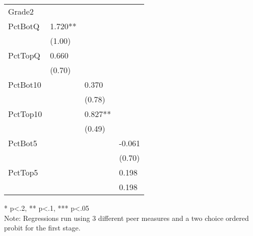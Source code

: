 \begin{table}[!htbp]
\begin{threeparttable}
\begin{tabular}{l l l l}
      Grade2   &                               &                               &                              \\
      PctBotQ  & 1.720**                       &                               &                              \\
               & (1.00)                        &                               &                              \\
      PctTopQ  & 0.660                         &                               &                              \\
               & (0.70)                        &                               &                              \\
      PctBot10 &                               & 0.370                         &                              \\
               &                               & (0.78)                        &                              \\
      PctTop10 &                               & 0.827**                       &                              \\
               &                               & (0.49)                        &                              \\
      PctBot5  &                               &                               & -0.061                       \\
               &                               &                               & (0.70)                       \\
      PctTop5  &                               &                               & 0.198                        \\
               &                               &                               & 0.198                        \\
      \hline
      \hline
    \end{tabular}
    \begin{tablenotes}
    \item{* p<.2, ** p<.1, *** p<.05 \\Note: Regressions run using 3 different peer measures and a two choice ordered probit for the first stage.}
    \end{tablenotes}
  \end{threeparttable}
\end{table}

\clearpage{}

